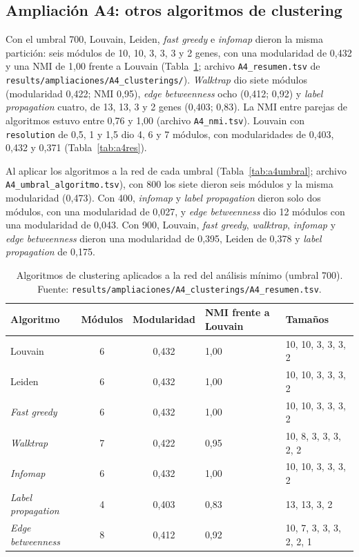 \subsection{Ampliación A4: otros algoritmos de clustering}
Con el umbral 700, Louvain, Leiden, \textit{fast greedy} e \textit{infomap} dieron la misma partición: seis módulos de 10, 10, 3, 3, 3 y 2 genes, con una modularidad de 0,432 y una NMI de 1,00 frente a Louvain (Tabla~\ref{tab:a4}; archivo \texttt{A4\_resumen.tsv} de \texttt{results/ampliaciones/A4\_clusterings/}). \textit{Walktrap} dio siete módulos (modularidad 0,422; NMI 0,95), \textit{edge betweenness} ocho (0,412; 0,92) y \textit{label propagation} cuatro, de 13, 13, 3 y 2 genes (0,403; 0,83). La NMI entre parejas de algoritmos estuvo entre 0,76 y 1,00 (archivo \texttt{A4\_nmi.tsv}). Louvain con \texttt{resolution} de 0,5, 1 y 1,5 dio 4, 6 y 7 módulos, con modularidades de 0,403, 0,432 y 0,371 (Tabla~\ref{tab:a4res}).

Al aplicar los algoritmos a la red de cada umbral (Tabla~\ref{tab:a4umbral}; archivo \texttt{A4\_umbral\_\allowbreak algoritmo.tsv}), con 800 los siete dieron seis módulos y la misma modularidad (0,473). Con 400, \textit{infomap} y \textit{label propagation} dieron solo dos módulos, con una modularidad de 0,027, y \textit{edge betweenness} dio 12 módulos con una modularidad de 0,043. Con 900, Louvain, \textit{fast greedy}, \textit{walktrap}, \textit{infomap} y \textit{edge betweenness} dieron una modularidad de 0,395, Leiden de 0,378 y \textit{label propagation} de 0,175.

\begin{table}[h!]
	\renewcommand{\arraystretch}{1.25}
	\caption{Algoritmos de clustering aplicados a la red del análisis mínimo (umbral 700). Fuente: \texttt{results/ampliaciones/A4\_clusterings/A4\_resumen.tsv}.}
	\label{tab:a4}
	\begin{tabular}{lccll}
		\hline
		Algoritmo & Módulos & Modularidad & NMI frente a Louvain & Tamaños \tabularnewline
		\hline
		Louvain & 6 & 0,432 & 1,00 & 10, 10, 3, 3, 3, 2 \tabularnewline
		Leiden & 6 & 0,432 & 1,00 & 10, 10, 3, 3, 3, 2 \tabularnewline
		\textit{Fast greedy} & 6 & 0,432 & 1,00 & 10, 10, 3, 3, 3, 2 \tabularnewline
		\textit{Walktrap} & 7 & 0,422 & 0,95 & 10, 8, 3, 3, 3, 2, 2 \tabularnewline
		\textit{Infomap} & 6 & 0,432 & 1,00 & 10, 10, 3, 3, 3, 2 \tabularnewline
		\textit{Label propagation} & 4 & 0,403 & 0,83 & 13, 13, 3, 2 \tabularnewline
		\textit{Edge betweenness} & 8 & 0,412 & 0,92 & 10, 7, 3, 3, 3, 2, 2, 1 \tabularnewline
		\hline
	\end{tabular}
\end{table}

